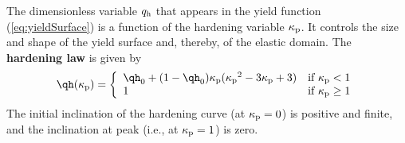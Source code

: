 \documentclass[a4paper]{article}
\begin{document}
The dimensionless variable $q_{\rm h}$ that appears in the yield function (\ref{eq:yieldSurface}) is a function of the hardening variable $\kappa_{\rm p}$. It controls the size and shape of the yield surface and, thereby, of the elastic domain. 
The {\bf hardening law} is given by
%
\begin{equation} \label{eq:hardeningLaw}
\qh(\kappa_{\rm p}) = \left\{ \begin{array}{ll}
{\qh}_0 + (1-{\qh}_0)\kappa_{\rm p}({\kappa_{\rm p}}^2 - 3\kappa_{\rm p}+3) & \mbox{if $\kappa_{\rm p} < 1$} \\
1 & \mbox{if $\kappa_{\rm p} \ge 1$}
\end{array}
\right.
\end{equation}
%
The initial inclination of the hardening curve (at $\kappa_{\rm p}=0$) is positive and finite, and the inclination at peak (i.e., at $\kappa_{\rm p} = 1$) is zero.
\end{document}
